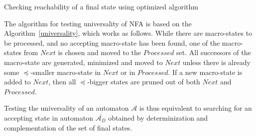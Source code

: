 \begin{algorithm}[ht!]
		\BlankLine
		\BlankLine
		\caption{Checking reachability of a
		final state using optimized algorithm\cite{tacas}}\label{universality}
	\end{algorithm}
	
The algorithm for testing universality of NFA is based on the
Algorithm~\ref{universality}, which works as follows.
While there are macro-states to be processed, and no accepting macro-state has
been found, one of the macro-states from $\mathit{Next}$ is chosen and moved to
the $\mathit{Processed}$ set. All successors of the macro-state are generated,
minimized and moved to $\mathit{Next}$ unless there is already some
$\preceq$-smaller macro-state in $\mathit{Next}$ or in $\mathit{Processed}$. If
a new macro-state is added to $\mathit{Next}$, then all $\preceq$-bigger states
are pruned out of both $\mathit{Next}$ and $\mathit{Processed}$.

Testing the universality of an automaton $\mathcal{A}$ is thus equivalent to
searching for an accepting state in automaton $\overline{\mathcal{A}_D}$
obtained by determinization and complementation of the set of final states.
	
